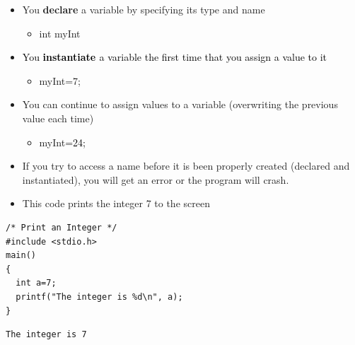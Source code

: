 \documentclass{beamer}
\begin{document}
\begin{frame}
\begin{itemize}
\item You \textbf{declare} a variable by specifying its type and name
\begin{itemize}
\item int myInt
\end{itemize}
\item \textcolor{black}{You }\textbf{\textcolor{black}{instantiate }}\textcolor{black}{ a variable the first time that you assign a value to it}
\begin{itemize}
\item {\color{black} myInt=7;}
\end{itemize}
\item You can continue to assign values to a variable (overwriting the previous value each time)
\begin{itemize}
\item myInt\textcolor{black}{=24;}
\end{itemize}
\end {itemize}
\end{frame}

\begin{frame}
\begin{itemize}
\item If you try to access a name before it is been properly created (declared and instantiated), you will get an error or the program will crash.
\end{itemize}
\end{frame}

\begin{frame}[fragile]
\begin{itemize}
\item This code prints the integer 7 to the screen
\end{itemize}
\begin{block}{}
\begin{lstlisting}
/* Print an Integer */
#include <stdio.h>
main()
{
  int a=7;
  printf("The integer is %d\n", a);
}
\end{lstlisting}
\end{block}

\begin{block}{}
\begin{lstlisting}
The integer is 7
\end{lstlisting}
\end{block}

\end{frame}
\end{document}

